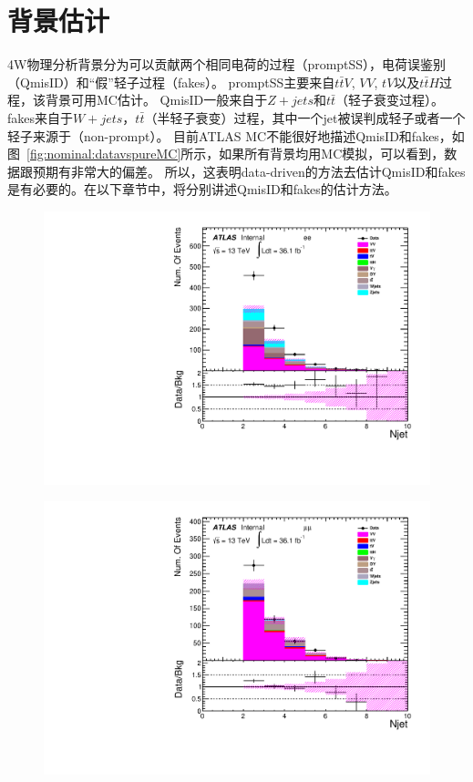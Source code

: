 \chapter{背景估计}\label{chap:bkg_estimation}
4W物理分析背景分为可以贡献两个相同电荷的过程（promptSS），电荷误鉴别（QmisID）和“假”轻子过程（fakes）。
promptSS主要来自$t\bar{t}V$, $VV$, $tV$以及$t\bar{t}H$过程，该背景可用MC估计。
QmisID一般来自于$Z+jets$和$t\bar{t}$（轻子衰变过程）。
fakes来自于$W+jets$，$t\bar{t}$（半轻子衰变）过程，其中一个jet被误判成轻子或者一个轻子来源于\bjet （non-prompt）。
目前ATLAS MC不能很好地描述QmisID和fakes，如图~\ref{fig:nominal:datavspureMC}所示，如果所有背景均用MC模拟，可以看到，数据跟预期有非常大的偏差。
所以，这表明data-driven的方法去估计QmisID和fakes是有必要的。在以下章节中，将分别讲述QmisID和fakes的估计方法。
\begin{figure}[h]
\begin{minipage}[t]{0.3\linewidth}
 \centering
 \includegraphics[width=1.0\textwidth,angle=-90]{fig/nominal/numOfjet_ee.pdf}
 \label{fig:nominal:numOfjet_ee.pdf}
 \end{minipage}
\begin{minipage}[t]{0.3\linewidth}
 \centering
 \includegraphics[width=1.0\textwidth,angle=-90]{fig/nominal/numOfjet_mumu.pdf}

\end{minipage}
\end{figure}
